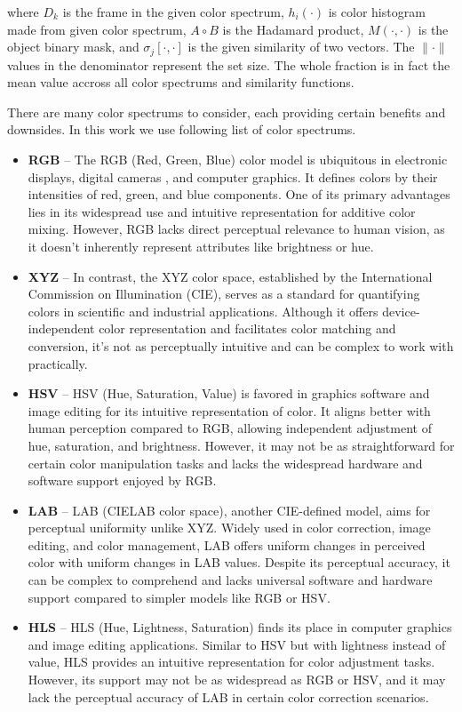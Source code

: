 where $D_k$ is the frame in the given color spectrum, $h_i(\cdot)$ is color histogram made from given color spectrum, $A\circ B$ is the Hadamard product, $M(\cdot, \cdot)$ is the object binary mask, and $\sigma_j[\cdot, \cdot]$ is the given similarity of two vectors. The $\|\cdot\|$ values in the denominator represent the set size. The whole fraction is in fact the mean value accross all color spectrums and similarity functions.

There are many color spectrums to consider, each providing certain benefits and downsides. In this work we use
following list of color spectrums.
\begin{itemize}
  \item \textbf{RGB} -- The RGB (Red, Green, Blue) color model is ubiquitous in electronic displays, digital cameras
  , and computer graphics. It defines colors by their intensities of red, green, and blue components. One of its primary advantages lies in its widespread use and intuitive representation for additive color mixing. However, RGB lacks direct perceptual relevance to human vision, as it doesn't inherently represent attributes like brightness or hue.
  \item \textbf{XYZ} -- In contrast, the XYZ color space, established by the International Commission on Illumination
  (CIE), serves as a standard for quantifying colors in scientific and industrial applications. Although it offers device-independent color representation and facilitates color matching and conversion, it's not as perceptually intuitive and can be complex to work with practically.
  \item \textbf{HSV} -- HSV (Hue, Saturation, Value) is favored in graphics software and image editing for its
  intuitive representation of color. It aligns better with human perception compared to RGB, allowing independent adjustment of hue, saturation, and brightness. However, it may not be as straightforward for certain color manipulation tasks and lacks the widespread hardware and software support enjoyed by RGB.
  \item \textbf{LAB} -- LAB (CIELAB color space), another CIE-defined model, aims for perceptual uniformity unlike
  XYZ. Widely used in color correction, image editing, and color management, LAB offers uniform changes in perceived color with uniform changes in LAB values. Despite its perceptual accuracy, it can be complex to comprehend and lacks universal software and hardware support compared to simpler models like RGB or HSV.
  \item \textbf{HLS} --  HLS (Hue, Lightness, Saturation) finds its place in computer graphics and image editing
  applications. Similar to HSV but with lightness instead of value, HLS provides an intuitive representation for color adjustment tasks. However, its support may not be as widespread as RGB or HSV, and it may lack the perceptual accuracy of LAB in certain color correction scenarios.
\end{itemize}

